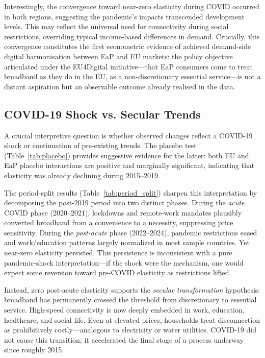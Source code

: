 Interestingly, the convergence toward near-zero elasticity during COVID occurred in both regions, suggesting the pandemic's impacts transcended development levels. This may reflect the universal need for connectivity during social restrictions, overriding typical income-based differences in demand. Crucially, this convergence constitutes the first econometric evidence of achieved demand-side digital harmonisation between EaP and EU markets: the policy objective articulated under the EU4Digital initiative---that EaP consumers come to treat broadband as they do in the EU, as a non-discretionary essential service---is not a distant aspiration but an observable outcome already realised in the data.

\subsection{COVID-19 Shock vs. Secular Trends}

A crucial interpretive question is whether observed changes reflect a COVID-19 shock or
continuation of pre-existing trends. The placebo test (Table~\ref{tab:placebo}) provides
suggestive evidence for the latter: both EU and EaP
placebo interactions are positive and marginally significant, indicating that elasticity
was already declining during 2015--2019.

The period-split results (Table~\ref{tab:period_split}) sharpen this interpretation by
decomposing the post-2019 period into two distinct phases. During the \emph{acute} COVID
phase (2020--2021), lockdowns and remote-work mandates plausibly converted broadband from
a convenience to a necessity, suppressing price sensitivity. During the \emph{post-acute}
phase (2022--2024), pandemic restrictions eased and work/education patterns largely normalized
in most sample countries. Yet near-zero elasticity persisted. This persistence is
inconsistent with a pure pandemic-shock interpretation---if the shock were the mechanism,
one would expect some reversion toward pre-COVID elasticity as restrictions lifted.

Instead, zero post-acute elasticity supports the \emph{secular transformation} hypothesis:
broadband has permanently crossed the threshold from discretionary to essential service.
High-speed connectivity is now deeply embedded
in work, education, healthcare, and social life. Even at elevated prices, households treat
disconnection as prohibitively costly---analogous to electricity or water utilities. COVID-19
did not cause this transition; it accelerated the final stage of a process underway since
roughly 2015.


